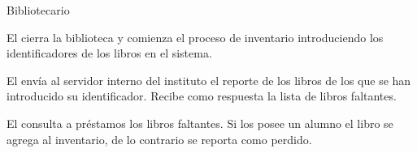 \begin{PDescripcion}

  \Ppaso Bibliotecario
	\begin{enumerate}
		\Ppaso[\itarea]  El  cierra la biblioteca y comienza el proceso de inventario introduciendo los identificadores de los libros en el sistema.
		
		\Ppaso[\itarea]  El  envía al servidor interno del instituto el reporte de los libros de los que se han introducido su identificador. Recibe como respuesta la lista de libros faltantes.
		
		\Ppaso[\itarea]  El  consulta a préstamos los libros faltantes. Si los posee un alumno el libro se agrega al inventario, de lo contrario se reporta como perdido.
	\end{enumerate}
\end{PDescripcion}




